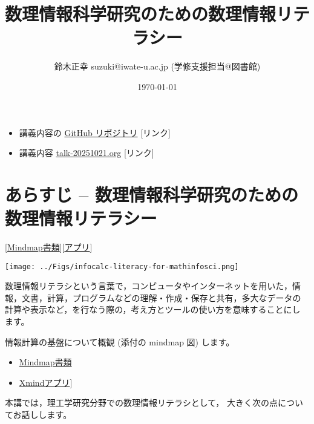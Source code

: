 \documentclass[dvipdfmx,11pat]{jarticle}
\author{鈴木正幸 suzuki@iwate-u.ac.jp (学修支援担当@図書館)}
\date{\today}
\title{ 数理情報科学研究のための数理情報リテラシー}
\begin{document}
\maketitle
\begin{itemize}
\item 講義内容の \href{https://github.com/masayuki054/comp\_and\_cal/}{GitHub リポジトリ} {[}リンク]
\item 講義内容 \href{https://github.com/masayuki054/comp\_and\_cal/blob/master/org/talk-20251021.org}{talk-20251021.org} {[}リンク]
\end{itemize}
\section{あらすじ -- 数理情報科学研究のための数理情報リテラシー}
\label{sec:org5aa60b1}

{[}\href{../Maps/数理情報科学のための情報計算リテラシー.xmind}{Mindmap書類}][\href{shell:xmind ../Maps/数理情報科学のための情報計算リテラシー.xmind}{アプリ}]

\begin{center}
\texttt{[image: ../Figs/infocalc-literacy-for-mathinfosci.png]}
\end{center}

数理情報リテラシという言葉で，コンピュータやインターネットを用いた，情
報，文書，計算，プログラムなどの理解・作成・保存と共有，多大なデータの
計算や表示など，を行なう際の，考え方とツールの使い方を意味することにし
ます。

情報計算の基盤について概観 (添付の mindmap 図) します。
\begin{itemize}
\item \href{../Maps/ICTの利用目的.xmind}{Mindmap書類}
\item \href{shell:xmind ../Maps/ICTの利用目的.xmind}{Xmindアプリ}]
\end{itemize}

本講では，理工学研究分野での数理情報リテラシとして，
大きく次の点についてお話しします。
\end{document}
